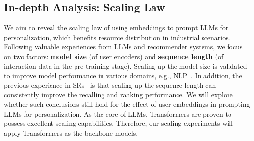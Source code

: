 \subsection{In-depth Analysis: Scaling Law}

We aim to reveal the scaling law of using embeddings to prompt LLMs for personalization, which benefits resource distribution in industrial scenarios. Following valuable experiences from LLMs and recommender systems, we focus on two factors: \textbf{model size} (of user encoders) and \textbf{sequence length} (of interaction data in the pre-training stage).
Scaling up the model size is validated to improve model performance in various domains, e.g., NLP~\cite{kaplan2020scaling}. 
In addition, the previous experience in SRs~\cite{fang2020deep} is that scaling up the sequence length can consistently improve the recalling and ranking performance. We will explore whether such conclusions still hold for the effect of user embeddings in prompting LLMs for personalization.  
As the core of LLMs, Transformers are proven to possess excellent scaling capabilities. Therefore, our scaling experiments will apply Transformers as the backbone models.





